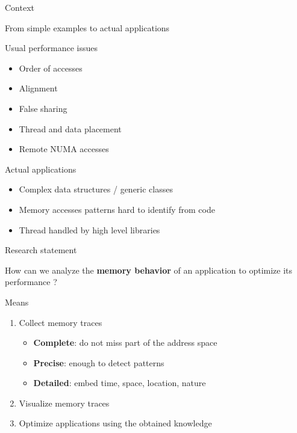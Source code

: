 \documentclass[xcolor={usenames,dvipsnames},hyperref={pdfusetitle}]{beamer}
\begin{document}
\begin{section}{Context}
\begin{frame}{From simple examples to actual applications}
    \begin{block}{Usual performance issues}
        \begin{itemize}
            \item Order of accesses
            \item Alignment
            \item False sharing
            \item Thread and data placement
            \item Remote NUMA accesses
        \end{itemize}
    \end{block}
    \pause
    \begin{alertblock}{Actual applications}
        \begin{itemize}
            \item Complex data structures / generic classes
            \item Memory accesses patterns hard to identify from code
            \item Thread handled by high level libraries
        \end{itemize}
    \end{alertblock}
\end{frame}

\begin{frame}{Research statement}
    \begin{exampleblock}{}
        How can we analyze the \textbf{memory behavior} of an application to optimize its performance ?
    \end{exampleblock}
    \pause
    \begin{block}{Means}
        \begin{enumerate}
                \item Collect memory traces
                \begin{itemize}
                    \item \textbf{Complete}: do not miss part of the address space
                    \item \textbf{Precise}:  enough to detect patterns
                    \item \textbf{Detailed}: embed time, space, location, nature
                \end{itemize}
                \item Visualize memory traces
                \item Optimize applications using the obtained knowledge
        \end{enumerate}
    \end{block}
\end{frame}

\end{section}
\end{document}
